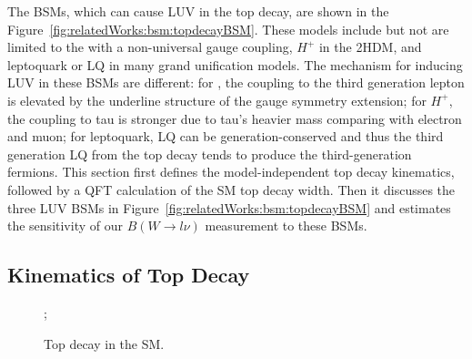 The BSMs, which can cause LUV in the top decay, are shown in the Figure~\ref{fig:relatedWorks:bsm:topdecayBSM}. These models include but not are limited to the \PWpr with a non-universal gauge coupling, $H^+$ in the 2HDM, and leptoquark or LQ in many grand unification models. The mechanism for inducing LUV in these BSMs are different: for \PWpr, the coupling to the third generation lepton is elevated by the underline structure of the gauge symmetry extension; for $H^+$, the coupling to tau is stronger due to tau's heavier mass comparing with electron and muon; for leptoquark, LQ can be generation-conserved and thus the third generation LQ from the top decay tends to produce the third-generation fermions. This section first defines the model-independent top decay kinematics, followed by a QFT calculation of the SM top decay width. Then it discusses the three LUV BSMs in Figure~\ref{fig:relatedWorks:bsm:topdecayBSM} and estimates the sensitivity of our $B(W\to l \nu )$ measurement to these BSMs.



\subsection{Kinematics of Top Decay}
\label{sec:relatedWorks:bsm:kinematics}

\begin{figure}[ht]
    \centering
    ;
    \caption{Top decay in the SM.}
    \label{fig:relatedWorks:bsm:topdecaySM}
\end{figure}

